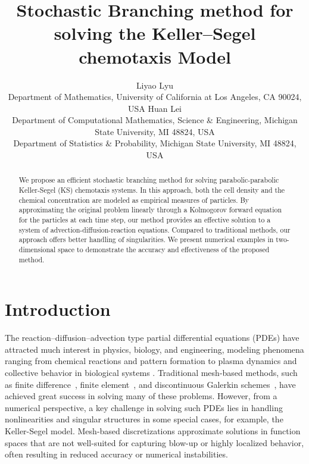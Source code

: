 \documentclass[12pt]{article}
\title{Stochastic Branching method for solving the Keller–Segel chemotaxis Model}
\author{
  Liyao Lyu\\
  Department of Mathematics, University of California at Los Angeles, CA 90024, USA
   \And
  Huan Lei\\
  Department of Computational Mathematics, Science \& Engineering, Michigan State University, MI 48824, USA\\
  Department of Statistics \& Probability, Michigan State University, MI 48824, USA}
\begin{document}
\maketitle

\keywords{} 
\begin{abstract}


We propose an efficient stochastic branching method for solving parabolic-parabolic Keller-Segel (KS) chemotaxis systems. In this approach, both the cell density and the chemical concentration are modeled as empirical measures of particles. By approximating the original problem linearly through a Kolmogorov forward equation for the particles at each time step, our method provides an effective solution to a system of advection-diffusion-reaction equations. Compared to traditional methods, our approach offers better handling of singularities. We present numerical examples in two-dimensional space to demonstrate the accuracy and effectiveness of the proposed method.

\end{abstract}


\section{Introduction}
The reaction–diffusion–advection type partial differential equations (PDEs) have attracted much interest in physics, biology, and engineering, modeling phenomena ranging from chemical reactions and pattern formation to plasma dynamics and collective behavior in biological systems \cite{hundsdorfer2013numerical}. Traditional mesh-based methods, such as finite difference~\cite{hoff1978stability}, finite element~\cite{codina1998comparison}, and discontinuous Galerkin schemes~\cite{ayuso2009discontinuous,xia2009application}, have achieved great success in solving many of these problems. However, from a numerical perspective, a key challenge in solving such PDEs lies in handling nonlinearities and singular structures in some special cases, for example, the Keller-Segel model. Mesh-based discretizations approximate solutions in function spaces that are not well-suited for capturing blow-up or highly localized behavior, often resulting in reduced accuracy or numerical instabilities.
\end{document}
